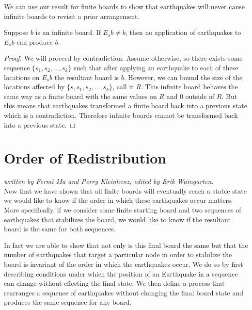\documentclass[runningheads,a4paper]{llncs}
\begin{document}
We can use our result for finite boards to show that earthquakes will never cause infinite boards to revisit a prior arrangement.  

\begin{corollary}
Suppose $b$ is an infinite board. If $E_s b \neq b$, then no application of earthquakes to $E_s b$ can produce $b$.
\end{corollary}

\begin{proof}
We will proceed by contradiction. Assume otherwise, so there exists some sequence $\{s_1, s_2, \ldots, s_k\}$ such that after applying an earthquake to each of these locations on $E_s b$ the resultant board is $b$.
However, we can bound the size of the locations affected by $\{s, s_1, s_2, \ldots, s_k \}$, call it $R$.  This infinite board behaves the same way as a finite board with the same values on $R$ and 0 outside of $R$. But this means that earthquakes transformed a finite board back into a previous state which is a contradiction. Therefore infinite boards cannot be transformed back into a previous state.
\end{proof}

\section{Order of Redistribution}
\label{Order of Redistribution}

\emph{written by Fermi Ma and Perry Kleinhenz, edited by Erik Waingarten.}\\

Now that we have shown that all finite boards will eventually reach a stable state we would like to know if the order in which these earthquakes occur matters. More specifically, if we consider some finite starting board and two sequences of earthquakes that stabilizes the board, we would like to know if the resultant board is the same for both sequences. 

In fact we are able to show that not only is this final board the same but that the number of earthquakes that target a particular node in order to stabilize the board is invariant of the order in which the earthquakes occur. We do so by first describing conditions under which the position of an Earthquake in a sequence can change without effecting the final state. We then define a process that rearranges a sequence of earthquakes without changing the final board state and produces the same sequence for any board.\\
\end{document}
